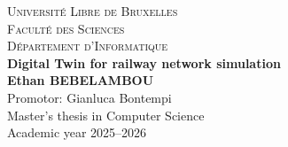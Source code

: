 \begin{titlepage}
    \centering
    \vspace*{2cm}
    \textsc{\LARGE Université Libre de Bruxelles}\\[1.5cm]
    \textsc{\Large Faculté des Sciences}\\
    \textsc{\large Département d'Informatique}\\[2.5cm]
    {\Huge \bfseries Digital Twin for railway network simulation}\\[0.4cm]
    \textbf{Ethan BEBELAMBOU}\\[0.5cm]
    Promotor: Gianluca Bontempi\\[1cm]
    \vfill
    Master's thesis in Computer Science\\
    Academic year 2025--2026
\end{titlepage}

